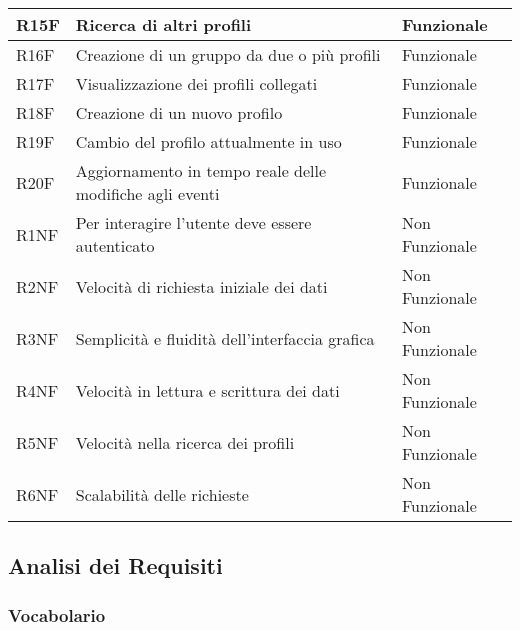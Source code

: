 \begin{tabular} {|P{1.3cm}|P{11.2cm}|P{3cm}|}
  \hline
  R15F        & Ricerca di altri profili                                                    & Funzionale     \\
  \hline
  R16F        & Creazione di un gruppo da due o più profili                                 & Funzionale     \\
  \hline
  R17F        & Visualizzazione dei profili collegati                                       & Funzionale     \\
  \hline
  R18F        & Creazione di un nuovo profilo                                               & Funzionale     \\
  \hline
  R19F        & Cambio del profilo attualmente in uso                                       & Funzionale     \\
  \hline
  R20F        & Aggiornamento in tempo reale delle modifiche agli eventi                    & Funzionale     \\
  \hline
  R1NF        & Per interagire l’utente deve essere autenticato                             & Non Funzionale \\
  \hline
  R2NF        & Velocità di richiesta iniziale dei dati                                     & Non Funzionale \\
  \hline
  R3NF        & Semplicità e fluidità dell'interfaccia grafica                              & Non Funzionale \\
  \hline
  R4NF        & Velocità in lettura e scrittura dei dati                                    & Non Funzionale \\
  \hline
  R5NF        & Velocità nella ricerca dei profili                                          & Non Funzionale \\
  \hline
  R6NF        & Scalabilità delle richieste                                                 & Non Funzionale \\
  \hline
\end{tabular}
\clearpage

\subsection{Analisi dei Requisiti}
\subsubsection{Vocabolario}

